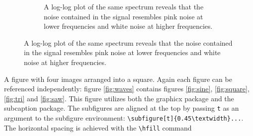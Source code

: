 \documentclass{article}
\begin{document}
\begin{figure}[h!]
\begin{subfigure}{0.6\textwidth}
            \caption{A log-log plot of the same spectrum reveals that the noise contained in the signal resembles pink noise at lower frequencies and white noise at higher frequencies.}
            \label{fig:ft-log}
        \end{subfigure}   
    \end{figure}

    \pagebreak

    A figure with four images arranged into a square. Again each figure can be referenced independently: figure \ref{fig:waves} contains figures \ref{fig:sine}, \ref{fig:square}, \ref{fig:tri}
    and \ref{fig:saw}. This figure utilizes both the graphicx package and the subcaption package. The subfigures are aligned at the top by passing \texttt{t} as an argument to the subfigure
    environment: \texttt{\textbackslash subfigure[t]\{0.45\textbackslash textwidth\}...}. The horizontal spacing is achieved with the \texttt{\textbackslash hfill} command
\end{document}
